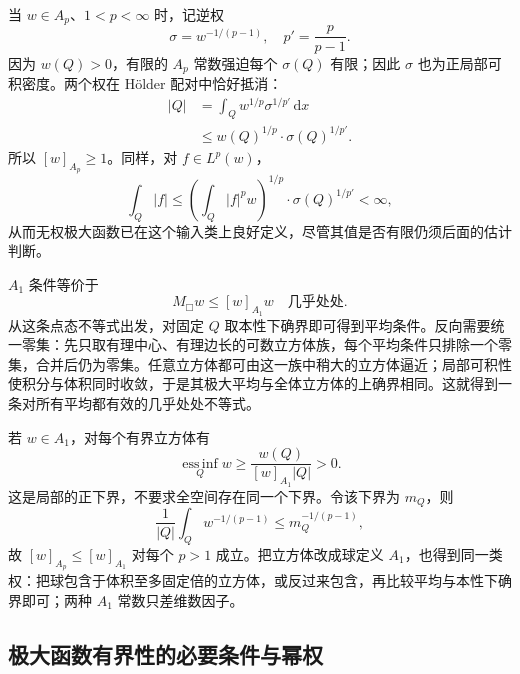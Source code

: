 当 \(w\in A_p\)、\(1<p<\infty\) 时，记逆权
\[
 \sigma=w^{-1/(p-1)},\quad p'=\frac p{p-1}.
\]
因为 \(w(Q)>0\)，有限的 \(A_p\) 常数强迫每个 \(\sigma(Q)\) 有限；因此 \(\sigma\) 也为正局部可积密度。两个权在 Hölder 配对中恰好抵消：
\[
 \begin{aligned}
 |Q|
 &=\int_Qw^{1/p}\sigma^{1/p'}\,\mathrm dx\\
 &\leq w(Q)^{1/p}\cdot\sigma(Q)^{1/p'}.
 \end{aligned}
\]
所以 \([w]_{A_p}\geq1\)。同样，对 \(f\in L^p(w)\)，
\[
 \int_Q|f|
 \leq
 \left(\int_Q|f|^pw\right)^{1/p}
 \cdot\sigma(Q)^{1/p'}<\infty,
\]
从而无权极大函数已在这个输入类上良好定义，尽管其值是否有限仍须后面的估计判断。

\ProseParagraphBreak

\(A_1\) 条件等价于
\[
 M_\mdlgwhtsquare w\leq[w]_{A_1}w
       \quad\text{几乎处处}.
\]
从这条点态不等式出发，对固定 \(Q\) 取本性下确界即可得到平均条件。反向需要统一零集：先只取有理中心、有理边长的可数立方体族，每个平均条件只排除一个零集，合并后仍为零集。任意立方体都可由这一族中稍大的立方体逼近；局部可积性使积分与体积同时收敛，于是其极大平均与全体立方体的上确界相同。这就得到一条对所有平均都有效的几乎处处不等式。

\ProseParagraphBreak

若 \(w\in A_1\)，对每个有界立方体有
\[
 \operatorname*{ess\,inf}_Qw
       \geq\frac{w(Q)}{[w]_{A_1}|Q|}>0.
\]
这是局部的正下界，不要求全空间存在同一个下界。令该下界为 \(m_Q\)，则
\[
 \frac1{|Q|}\int_Qw^{-1/(p-1)}
       \leq m_Q^{-1/(p-1)},
\]
故 \([w]_{A_p}\leq[w]_{A_1}\) 对每个 \(p>1\) 成立。把立方体改成球定义 \(A_1\)，也得到同一类权：把球包含于体积至多固定倍的立方体，或反过来包含，再比较平均与本性下确界即可；两种 \(A_1\) 常数只差维数因子。

\subsection{极大函数有界性的必要条件与幂权}
\label{b2:subsec:C-ap-tests}

